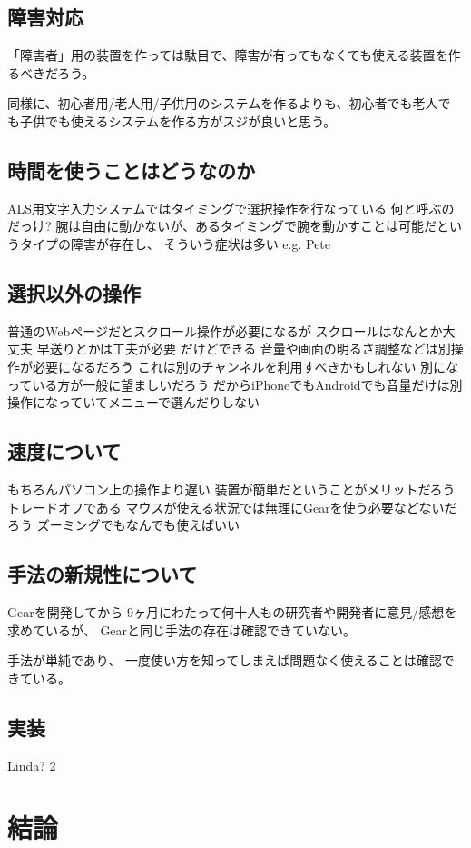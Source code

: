 \documentclass[twoside]{wiss}
\begin{document}
\subsection*{障害対応}

「障害者」用の装置を作っては駄目で、障害が有ってもなくても使える装置を作るべきだろう。

同様に、初心者用/老人用/子供用のシステムを作るよりも、初心者でも老人で
も子供でも使えるシステムを作る方がスジが良いと思う。

\subsection*{時間を使うことはどうなのか}

ALS用文字入力システムではタイミングで選択操作を行なっている
  何と呼ぶのだっけ?
  腕は自由に動かないが、あるタイミングで腕を動かすことは可能だというタイプの障害が存在し、
    そういう症状は多い
e.g. Pete

\subsection*{選択以外の操作}

普通のWebページだとスクロール操作が必要になるが
  スクロールはなんとか大丈夫
  早送りとかは工夫が必要
    だけどできる
音量や画面の明るさ調整などは別操作が必要になるだろう
     これは別のチャンネルを利用すべきかもしれない
     別になっている方が一般に望ましいだろう
       だからiPhoneでもAndroidでも音量だけは別操作になっていてメニューで選んだりしない

\subsection*{速度について}
   もちろんパソコン上の操作より遅い
   装置が簡単だということがメリットだろう
     トレードオフである
   マウスが使える状況では無理にGearを使う必要などないだろう
     ズーミングでもなんでも使えばいい

\subsection*{手法の新規性について}

Gearを開発してから
9ヶ月にわたって何十人もの研究者や開発者に意見/感想を求めているが、
Gearと同じ手法の存在は確認できていない。

手法が単純であり、
一度使い方を知ってしまえば問題なく使えることは確認できている。

\subsection*{実装}

Linda?
2
\section{結論}

{\scriptsize


}
\end{document}
